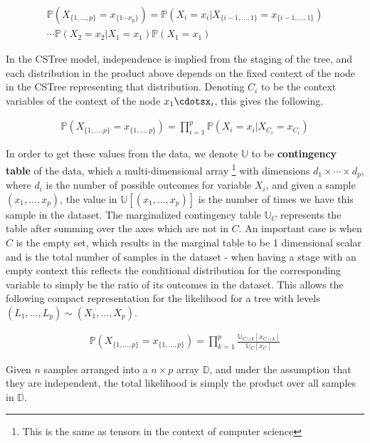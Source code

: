 \documentclass{tufte-book}
\begin{document}
\begin{align*}
\mathbb{P}(X_{\{1,...,p\}}=x_{\{1\cdots x_p\}}) =\mathbb{P}(X_i=x_i|X_{\{i-1,...,1\}}=x_{\{i-1,...,1 \}})\\\cdots\mathbb{P}(X_2=x_2|X_1=x_1)\mathbb{P}(X_1=x_1)
\end{align*}

In the CSTree model, independence is implied from the staging of the tree, and each distribution in the product above depends on the fixed context of the node in the CSTree representing that distribution. Denoting \(C_i\) to be the context variables of the context of the node \(x_1\cdotsx_i\), this gives the following.

\begin{align*}
\mathbb{P}(X_{\{1,...,p\}}=x_{\{1,..., p\}}) =\prod_{i=1}^p \mathbb{P}(X_i=x_i|X_{C_i}=x_{C_i})
\end{align*}


In order to get these values from the data, we denote \(\mathbb{U}\) to be \textbf{contingency table} of the data, which a multi-dimensional array  \footnote{This is the same as tensors in the context of computer science}   with dimensions \(d_1 \times \cdots \times d_p\), where \(d_i\) is the number of possible outcomes for variable \(X_i\), and given a sample \((x_1,...,x_p)\), the value in \(\mathbb{U}[(x_1,...,x_p)]\) is the number of times we have this sample in the dataset. The marginalized contingency table \(\mathbb{U}_C\) represents the table after summing over the axes which are not in \(C\). An important case is when \(C\) is the empty set, which results in the marginal table to be 1 dimensional scalar and is the total number of samples in the dataset - when having a stage with an empty context this reflects the conditional distribution for the corresponding variable to simply be the ratio of its outcomes in the dataset. This allows the following compact representation for the likelihood \cite{duarte-2021-repres-learn} for a tree with levels \((L_1,...,L_p) \sim (X_1,...,X_p)\).

\begin{align*}
\mathbb{P}(X_{\{1,...,p\}}=x_{\{1,..., p\}}) = \prod_{k=1}^p \frac{\mathbb{U}_{C \cup k}[x_{C \cup k}]}{\mathbb{U}_{C}[x_{C}]}
\end{align*}

Given \(n\) samples arranged into a \(n \times p\) array \(\mathbb{D}\), and under the assumption that they are independent, the total likelihood is simply the product over all samples in \(\mathbb{D}\).
\end{document}

